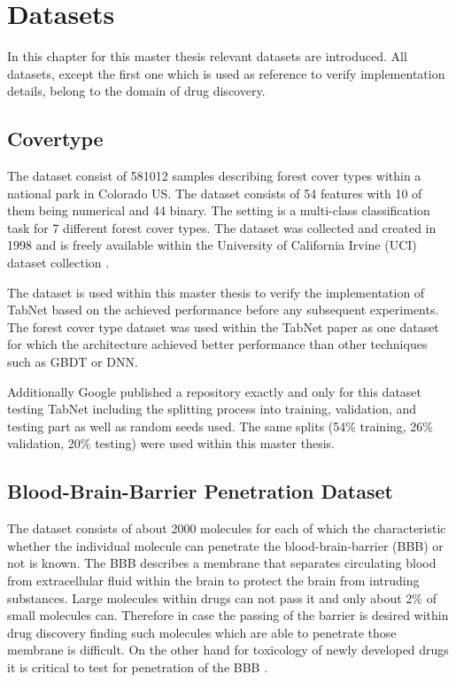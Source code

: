 \documentclass[../main.tex]{subfiles}
\begin{document}
\section{Datasets} \label{sec:datasets}

In this chapter for this master thesis relevant datasets are introduced. All datasets, except the first one which is used as reference to verify implementation details, belong to the domain of drug discovery.

\subsection{Covertype} \label{ssec:covertype}

The dataset consist of 581012 samples describing forest cover types within a national park in Colorado US. The dataset consists of 54 features with 10 of them being numerical and 44 binary. The setting is a multi-class classification task for 7 different forest cover types. The dataset was collected and created in 1998 \cite{blackard_comparative_1998} and is freely available within the University of California Irvine (UCI) dataset collection \cite{covertype_uci_nodate}. 

The dataset is used within this master thesis to verify the implementation of TabNet based on the achieved performance before any subsequent experiments. The forest cover type dataset was used within the TabNet paper \cite{arik_tabnet_2020} as one dataset for which the architecture achieved better performance than other techniques such as GBDT or DNN. 

Additionally Google published a repository exactly and only for this dataset testing TabNet \cite{noauthor_google-researchtabnet_nodate} including the splitting process into training, validation, and testing part as well as random seeds used. The same splits (54\% training, 26\% validation, 20\% testing) were used within this master thesis.

\subsection{Blood-Brain-Barrier Penetration Dataset} \label{ssec:bbbp}


The dataset consists of about 2000 molecules for each of which the characteristic whether the individual molecule can penetrate the blood-brain-barrier (BBB) or not is known. The BBB describes a membrane that separates circulating blood from extracellular fluid within the brain to protect the brain from intruding substances. Large molecules within drugs can not pass it and only about 2\% of small molecules can. Therefore in case the passing of the barrier is desired within drug discovery finding such molecules which are able to penetrate those membrane is difficult. On the other hand for toxicology of newly developed drugs it is critical to test for penetration of the BBB \cite {martins_bayesian_2012}.
\end{document}
